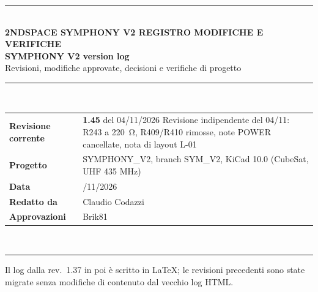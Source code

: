 \documentclass[10pt,a4paper]{article}
\begin{document}
\begin{titlepage}
\raggedright
\sffamily
{\color{accent}\rule{\linewidth}{4pt}}\\[8mm]
{\color{accent}\bfseries\small 2NDSPACE \textperiodcentered{} SYMPHONY V2 \textperiodcentered{} REGISTRO MODIFICHE E VERIFICHE}\\[4mm]
{\fontsize{26}{30}\selectfont\bfseries SYMPHONY V2 \textendash{} version log}\\[3mm]
{\large\color{tagnote} Revisioni, modifiche approvate, decisioni e verifiche di progetto}\\[10mm]
{\color{rulec}\rule{\linewidth}{0.4pt}}\\[4mm]
\begin{tabularx}{\linewidth}{@{}>{\hsize=0.45\hsize\raggedright\arraybackslash}X>{\hsize=1.55\hsize\raggedright\arraybackslash}X@{}}
\textbf{Revisione corrente} & \textbf{1.45} del 04/11/2026 \textendash{} Revisione indipendente del 04/11: R243 a \SI{220}{\ohm}, R409/R410 rimosse, note POWER cancellate, nota di layout L-01\\[4pt]
\textbf{Progetto} & SYMPHONY\_V2, branch SYM\_V2, KiCad 10.0 (CubeSat, UHF 435 MHz)\\[4pt]
\textbf{Data} & 04/11/2026\\[4pt]
\textbf{Redatto da} & Claudio Codazzi\\[4pt]
\textbf{Approvazioni} & Brik81\\
\end{tabularx}\\[3mm]
{\color{rulec}\rule{\linewidth}{0.4pt}}
\vfill
{\small Il log dalla rev.\ 1.37 in poi \`e scritto in \LaTeX; le revisioni precedenti sono state migrate senza modifiche di contenuto dal vecchio log HTML.}
\end{titlepage}
\setcounter{page}{2}

\renewcommand{\contentsname}{Indice}
\tableofcontents
\clearpage
\end{document}
